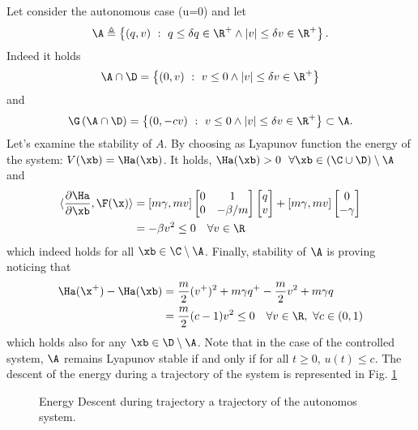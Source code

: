 \begin{exmp}
Let consider the autonomous case (u=0) and let 
%
\begin{equation}
    \A\triangleq \left\{(q,v)~:~q\leq\delta q\in\R^+\land |v|\leq\delta v\in\R^+\right\}.
\end{equation}
%
Indeed it holds 
%
\begin{equation}
    \A\cap\D = \left\{(0,v)~:~v\leq 0\land |v|\leq\delta v\in\R^+\right\}
\end{equation}
%
and
%
\begin{equation}
    \G\left(\A\cap\D\right) = \left\{(0,-cv)~:~v\leq 0\land |v|\leq\delta v\in\R^+\right\}\subset \A.
\end{equation}
%
Let's examine the stability of $A$. By choosing as Lyapunov function the energy of the system: $V(\xb) = \Ha(\xb)$. It holds, $\Ha(\xb)>0~~\forall \xb\in\left(\C\cup\D\right)\setminus\A$ and
%
\begin{align}
    \langle\frac{\partial\Ha}{\partial \xb},\F(\x)\rangle &= [m\gamma,mv]\begin{bmatrix}0&1\\0&-\beta/m\end{bmatrix}\begin{bmatrix}q\\v\end{bmatrix} + [m\gamma,mv] \begin{bmatrix}0\\-\gamma\end{bmatrix} \\
    & = -\beta v^2 \leq 0\quad\forall v\in\R
\end{align}
%
which indeed holds for all $\xb\in\C\setminus\A$.
%
Finally, stability of $\A$ is proving noticing that
%
\begin{align}
    \Ha(\x^+) -\Ha(\xb) &= \frac{m}{2}(v^+)^2 + m\gamma q^+ - \frac{m}{2}v^2 + m\gamma q\\
    &= \frac{m}{2}(c-1)v^2\leq 0 \quad\forall v\in\R,~\forall c\in(0,1)
\end{align}
%
which holds also for any $\xb\in\D\setminus\A$. Note that in the case of the controlled system, $\A$ remains Lyapunov stable if and only if for all $t\geq 0$, $u(t)\leq c$. The descent of the energy during a trajectory of the system is represented in Fig. \ref{fig:bb2}
%
\begin{figure}[!h]
    \centering
    \caption{Energy Descent during trajectory a trajectory of the autonomos system.}
    \label{fig:bb2}
\end{figure}
%
\end{exmp}
%
%
\clearpage